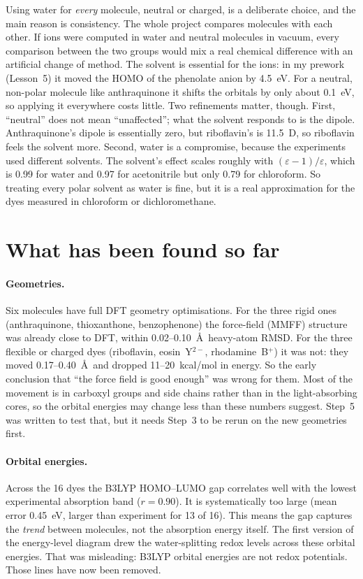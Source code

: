 \documentclass[11pt,a4paper]{article}
\begin{document}
Using water for \emph{every} molecule, neutral or charged, is a deliberate choice, and the main
reason is consistency. The whole project compares molecules with each other. If ions were computed
in water and neutral molecules in vacuum, every comparison between the two groups would mix a real
chemical difference with an artificial change of method. The solvent is essential for the ions: in
my prework (Lesson~5) it moved the HOMO of the phenolate anion by 4.5~eV. For a neutral, non-polar
molecule like anthraquinone it shifts the orbitals by only about 0.1~eV, so applying it everywhere
costs little. Two refinements matter, though. First, ``neutral'' does not mean ``unaffected''; what
the solvent responds to is the dipole. Anthraquinone's dipole is essentially zero, but riboflavin's
is 11.5~D, so riboflavin feels the solvent more. Second, water is a compromise, because the
experiments used different solvents. The solvent's effect scales roughly with
$(\varepsilon-1)/\varepsilon$, which is 0.99 for water and 0.97 for acetonitrile but only 0.79 for
chloroform. So treating every polar solvent as water is fine, but it is a real approximation for
the dyes measured in chloroform or dichloromethane.

\section{What has been found so far}

\paragraph{Geometries.} Six molecules have full DFT geometry optimisations. For the three rigid ones
(anthraquinone, thioxanthone, benzophenone) the force-field (MMFF) structure was already close to
DFT, within 0.02--0.10~\AA\ heavy-atom RMSD. For the three flexible or charged dyes (riboflavin,
eosin~Y$^{2-}$, rhodamine~B$^+$) it was not: they moved 0.17--0.40~\AA\ and dropped 11--20~kcal/mol
in energy. So the early conclusion that ``the force field is good enough'' was wrong for them.
Most of the movement is in carboxyl groups and side chains rather than in the light-absorbing
cores, so the orbital energies may change less than these numbers suggest. Step~5 was written to
test that, but it needs Step~3 to be rerun on the new geometries first.

\paragraph{Orbital energies.} Across the 16 dyes the B3LYP HOMO--LUMO gap correlates well with the
lowest experimental absorption band ($r = 0.90$). It is systematically too large (mean error
0.45~eV, larger than experiment for 13 of 16). This means the gap captures the \emph{trend} between
molecules, not the absorption energy itself. The first version of the energy-level diagram drew
the water-splitting redox levels across these orbital energies. That was misleading: B3LYP orbital
energies are not redox potentials. Those lines have now been removed.
\end{document}
